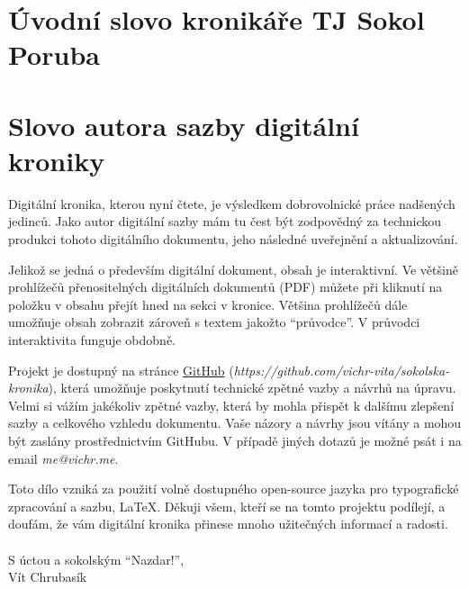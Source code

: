 \documentclass[openany]{report}
\begin{document}
\tableofcontents
\restoregeometry



\section{Úvodní slovo kronikáře TJ Sokol Poruba}




\section{Slovo autora sazby digitální kroniky}

Digitální kronika, kterou nyní čtete, je výsledkem dobrovolnické práce nadšených jedinců. Jako autor digitální sazby mám tu čest být zodpovědný za technickou produkci tohoto digitálního dokumentu, jeho následné uveřejnění a aktualizování.

Jelikož se jedná o především digitální dokument, obsah je interaktivní. Ve většině prohlížečů přenositelných digitálních dokumentů (PDF) můžete při kliknutí na položku v obsahu přejít hned na sekci v kronice. Většina prohlížečů dále umožňuje obsah zobrazit zároveň s textem jakožto \enquote{průvodce}. V průvodci interaktivita funguje obdobně.

Projekt je dostupný na stránce \href{https://github.com/vichr-vita/sokolska-kronika}{GitHub} (\emph{https://github.com/vichr-vita/sokolska-kronika}), která umožňuje poskytnutí technické zpětné vazby a návrhů na úpravu. Velmi si vážím jakékoliv zpětné vazby, která by mohla přispět k dalšímu zlepšení sazby a celkového vzhledu dokumentu. Vaše názory a návrhy jsou vítány a mohou být zaslány prostřednictvím GitHubu. V případě jiných dotazů je možné psát i na email \emph{me@vichr.me}.

Toto dílo vzniká za použití volně dostupného open-source jazyka pro typografické zpracování a sazbu, \LaTeX. Děkuji všem, kteří se na tomto projektu podílejí, a doufám, že vám digitální kronika přinese mnoho užitečných informací a radosti.\\\\
S úctou a sokolským \enquote{Nazdar!},\\
Vít Chrubasík
\restoregeometry
\end{document}
